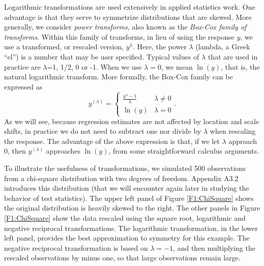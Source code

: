 Logarithmic transformations are used extensively in applied
statistics work. One advantage is that they serve to symmetrize
distributions that are skewed. More generally, we consider
\emph{power transforms}, also known as the \emph{Box-Cox family of
transforms}. Within this family of transforms, in lieu of using the
response $y$, we use a transformed, or rescaled version, $y^{\lambda
}$. Here, the power $\lambda $ (lambda, a Greek ``el'') is a number
that may be user specified. Typical values of $\lambda $ that are
used in practice are $\lambda $=1, 1/2, 0 or -1. When we use
$\lambda =0$, we mean $\ln (y)$, that is, the natural logarithmic
transform. More formally, the Box-Cox family can be expressed as
\begin{equation*}
y^{(\lambda )}=\left\{
\begin{array}{ll}
\frac{y^{\lambda }-1}{\lambda } & \lambda \neq 0 \\
\ln (y) & \lambda =0
\end{array}
\right. .
\end{equation*}
As we will see, because regression estimates are not affected by
location and scale shifts, in practice we do not need to subtract
one nor divide by $\lambda $ when rescaling the response. The
advantage of the above expression is that, if we let $\lambda $
approach 0, then $y^{(\lambda )}$ approaches $\ln (y)$, from some
straightforward calculus arguments.

To illustrate the usefulness of transformations, we simulated 500
observations from a chi-square distribution with two degrees of
freedom. Appendix A3.2 introduces this distribution (that we will
encounter again later in studying the behavior of test statistics).
The upper left panel of Figure \ref{F1:ChiSquare} shows the original
distribution is heavily skewed to the right. The other panels in
Figure \ref{F1:ChiSquare} show the data rescaled using the square
root, logarithmic and negative reciprocal transformations. The
logarithmic transformation, in the lower left panel, provides the
best approximation to symmetry for this example. The negative
reciprocal transformation is based on $\lambda =-1$, and then
multiplying the rescaled observations by minus one, so that large
observations remain large.



